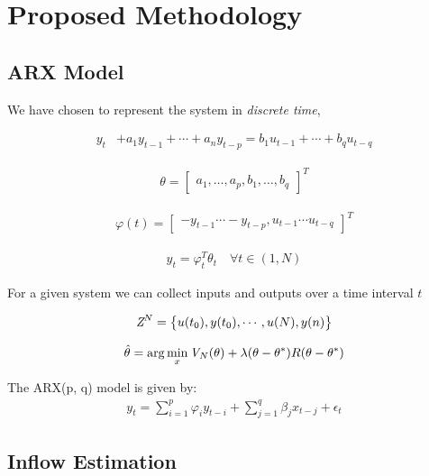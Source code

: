 \section{Proposed Methodology}
\subsection{ARX Model}
	We have chosen to represent the system in \textit{discrete time},
	
	\begin{align}
		y_t &+ a_1 y_{t-1} + \cdots + a_n y_{t-p} = b_1 u_{t-1} + \cdots + b_q u_{t-q}
	\end{align}

	\begin{align}
		\theta = \begin{bmatrix}
		a_1, \ldots, a_p, b_1, \ldots, b_q
		\end{bmatrix}^T
	\end{align} 

	\begin{align}
		\varphi(t) = \begin{bmatrix}
		-y_{t-1} \cdots - y_{t-p}, u_{t-1} \cdots u_{t-q}
		\end{bmatrix}^T
	\end{align}

	\begin{align}
		y_t = \varphi^T_t \theta_t \quad  \forall t \in (1, N)
	\end{align}



	For a given system we can collect inputs and outputs over a time
	interval $t$

	\begin{align}
		\emph{Z}^N = \big \{u(t_0), y(t_0), \cdots, u(N), y(n)\big \}
	\end{align}


	\begin{align}
		\hat{\theta} = \arg\min_{x} \emph{V}_N(\theta) + \lambda(\theta - \theta^*)R(\theta - \theta^*)
	\end{align}

	The ARX(p, q) model is given by:
	\begin{align}
	y_t = \sum_{i=1}^p \varphi_i y_{t-i} + \sum_{j=1}^q \beta_j x_{t-j} + \epsilon_t
	\end{align}



\subsection{Inflow Estimation}


